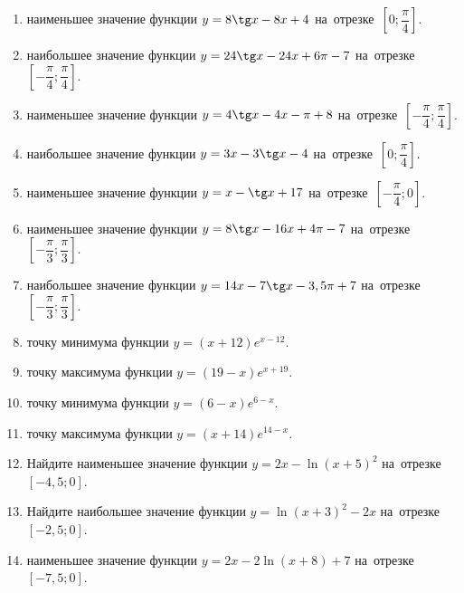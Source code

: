 \documentclass[a4paper,10pt]{article}
\begin{document}
\begin{enumerate}
\item {} наименьшее значение функции $y=8\tg x-8x+4$ на~отрезке~$\left[0;\dfrac{\pi }{4}\right]$.

\item {} наибольшее значение функции $y=24\tg x-24x+6\pi -7$ на~отрезке~$\left[-\dfrac{\pi }{4};\dfrac{\pi }{4}\right]$.

\item {} наименьшее значение функции $y=4\tg x-4x-\pi +8$ на~отрезке~$\left[-\dfrac{\pi }{4};\dfrac{\pi }{4}\right]$.

\item {} наибольшее значение функции $y=3x-3\tg x-4$ на~отрезке~$\left[0;\dfrac{\pi }{4}\right]$.

\item {} наименьшее значение функции $y=x-\tg x+17$ на~отрезке~$\left[-\dfrac{\pi }{4};0\right]$.

\item {} наименьшее значение функции $y=8\tg x-16x+4\pi -7$ на~отрезке~$\left[-\dfrac{\pi }{3};\dfrac{\pi }{3}\right]$.

\item {} наибольшее значение функции $y=14x-7\tg x-3,5\pi +7$ на~отрезке~$\left[-\dfrac{\pi }{3};\dfrac{\pi }{3}\right]$.

\item {} точку минимума функции $y=\left(x+12\right)e^{x-12}$.

\item {} точку максимума функции $y=\left(19-x\right)e^{x+19}$.

\item {} точку минимума функции $y=\left(6-x\right)e^{6-x}$.

\item {} точку максимума функции $y=\left(x+14\right)e^{14-x}$.

\item Найдите наименьшее значение функции $y=2x-\ln \left(x+5\right)^2$ на~отрезке~$\left[-4,5;0\right]$.

\item Найдите наибольшее значение функции $y=\ln \left(x+3\right)^2-2x$ на~отрезке~$\left[-2,5;0\right]$.

\item {} наименьшее значение функции $y=2x-2\ln \left(x+8\right)+7$ на~отрезке~$\left[-7,5;0\right]$.


\end{enumerate}
\end{document}
